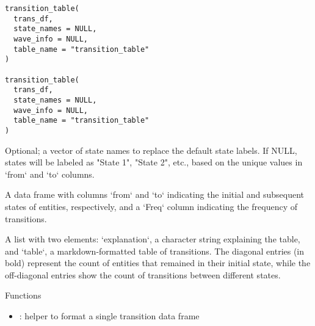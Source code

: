\documentclass[a4paper]{book}
\begin{document}
%
\begin{Usage}
\begin{verbatim}
transition_table(
  trans_df,
  state_names = NULL,
  wave_info = NULL,
  table_name = "transition_table"
)

transition_table(
  trans_df,
  state_names = NULL,
  wave_info = NULL,
  table_name = "transition_table"
)
\end{verbatim}
\end{Usage}
%
\begin{Arguments}
\begin{ldescription}
\item[\code{state\_names}] Optional; a vector of state names to replace the default state labels.
If NULL, states will be labeled as "State 1", "State 2", etc., based on the unique values
in `from` and `to` columns.

\item[\code{data}] A data frame with columns `from` and `to` indicating the initial and subsequent
states of entities, respectively, and a `Freq` column indicating the frequency of transitions.
\end{ldescription}
\end{Arguments}
%
\begin{Value}
A list with two elements: `explanation`, a character string explaining the table,
and `table`, a markdown-formatted table of transitions. The diagonal entries (in bold)
represent the count of entities that remained in their initial state, while the off-diagonal
entries show the count of transitions between different states.
\end{Value}
%
\begin{Section}{Functions}
\begin{itemize}

\item{} : helper to format a single transition data frame


\end{itemize}
\end{Section}
%
\begin{Examples}
\end{Examples}
\end{document}
